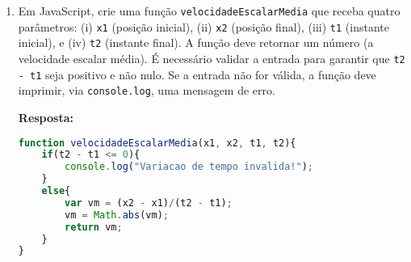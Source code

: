 \documentclass[12pt,a4paper,oneside]{article}
\begin{document}
\begin{enumerate}
	\newpage
	
	\item Em JavaScript, crie uma função {\tt velocidadeEscalarMedia} que receba quatro parâmetros: (i) {\tt x1} (posição inicial), (ii) {\tt x2} (posição final), (iii) {\tt t1} (instante inicial), e (iv) {\tt t2} (instante final). A função deve retornar um número (a velocidade escalar média). É necessário validar a entrada para garantir que  {\tt t2 - t1} seja positivo e não nulo. Se a entrada não for válida, a função deve imprimir, via {\tt console.log}, uma mensagem de erro.
	
	{\color{blue} \bf Resposta: }
	
\begin{lstlisting}[language=JavaScript]
function velocidadeEscalarMedia(x1, x2, t1, t2){
	if(t2 - t1 <= 0){
		console.log("Variacao de tempo invalida!");
	}
	else{
		var vm = (x2 - x1)/(t2 - t1);
		vm = Math.abs(vm);
		return vm;
	}
}\end{lstlisting}
	
	\end{enumerate}
\end{document}
